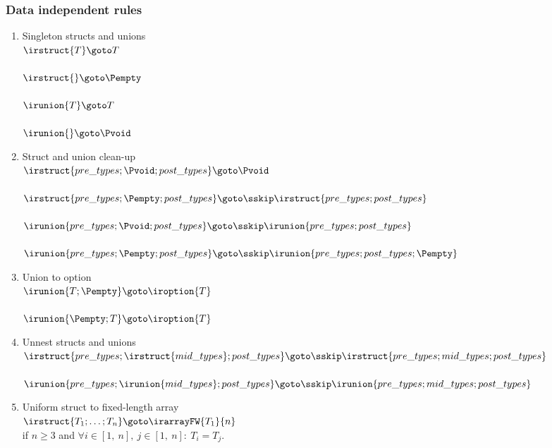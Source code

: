 \subsubsection*{Data independent rules}
\begin{enumerate}
\item Singleton structs and unions \\
$
\irstruct{T} \goto T
$\\ \\
$
\irstruct{} \goto \Pempty
$\\ \\
$
\irunion{T} \goto T
$\\ \\
$
\irunion{} \goto \Pvoid 
$ 

\item Struct and union clean-up\\
$
\irstruct{pre\_types; \Pvoid; post\_types} \goto \Pvoid
$\\ \\ 
$
\irstruct{pre\_types; \Pempty; post\_types} \goto \\
\sskip \irstruct{pre\_types; post\_types}
$\\ \\ 
$
\irunion{pre\_types; \Pvoid; post\_types} \goto \\
\sskip \irunion{pre\_types; post\_types} 
$\\ \\
$
\irunion{pre\_types; \Pempty; post\_types} \goto \\
\sskip \irunion{pre\_types; post\_types; \Pempty} 
$

\item Union to option\\
$
\irunion{T; \Pempty} \goto \iroption{T}
$\\ \\
$
\irunion{\Pempty; T} \goto \iroption{T}
$

\item Unnest structs and unions\\
$
\irstruct{pre\_types; \irstruct{mid\_types}; post\_types} \goto \\
\sskip \irstruct{pre\_types; mid\_types; post\_types}
$\\ \\
$
\irunion{pre\_types; \irunion{mid\_types}; post\_types} \goto \\
\sskip \irunion{pre\_types; mid\_types; post\_types}
$

\item Uniform struct to fixed-length array\\
$
\irstruct{T_1; \ldots; T_n} \goto \irarrayFW{T_1}{n}
$\\ 
\noindent if $n \ge 3$ and $\forall i \in [1,~ n],~ j \in [1,~ n]:~ T_i = T_j$.


\end{enumerate}
